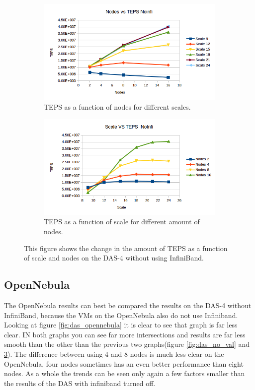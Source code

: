 \begin{figure}[!h]
\centering
\begin{subfigure}{.5\textwidth}
  \centering
  \includegraphics[width=\linewidth]{images/nodes_no_infini.png}
  \caption{TEPS as a function of nodes for different scales.}
  \label{fig:nodes_no_infini}
\end{subfigure}%
\begin{subfigure}{.5\textwidth}
  \centering
  \includegraphics[width=\linewidth]{images/scale_no_infini.png}
  \caption{TEPS as a function of scale for different amount of nodes.}
  \label{fig:scale_no_infini}
\end{subfigure}
\caption{This figure shows the change in the amount of TEPS as a function of scale and nodes on the DAS-4 without using InfiniBand.}
\label{fig:das_no_infini}
\end{figure}

\subsection{OpenNebula}
The OpenNebula results can best be compared the results on the DAS-4 without InfiniBand, because the VMs on the OpenNebula also do not use Infiniband.
Looking at figure \ref{fig:das_opennebula} it is clear to see that graph is far less clear. IN both graphs you can see far more intersections and results are far less smooth than the other than the previous two graphs(figure \ref{fig:das_no_val} and \ref{fig:das_no_infini}). The difference between using 4 and 8 nodes is much less clear on the OpenNebula, four nodes sometimes has an even better performance than eight nodes.
As a whole the trends can be seen only again a few factors smaller than the results of the DAS with infiniband turned off.

